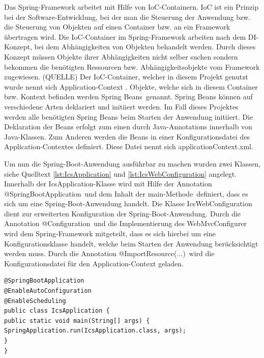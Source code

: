 Das Spring-Framework arbeitet mit Hilfe von \ac{IoC}-Containern. \ac{IoC} ist ein Prinzip bei der Software-Entwicklung, bei der man die Steuerung der Anwendung bzw. die Steuerung von Objekten auf einen Container bzw. an ein Framework übertragen wird. Die \ac{IoC}-Container im Spring-Framework arbeiten nach dem \ac{DI}-Konzept, bei dem Abhängigkeiten von Objekten behandelt werden. Durch dieses Konzept müssen Objekte ihrer Abhängigkeiten nicht selber suchen sondern bekommen die benötigten Ressourcen bzw. Abhängigkeitsobjekte vom Framework zugewiesen. (QUELLE) Der \ac{IoC}-Container, welcher in diesem Projekt genutzt wurde nennt sich \glqq Application-Context \grqq. Objekte, welche sich in diesem Container bzw. Kontext befinden werden \glqq Spring Beans\grqq \, genannt. Spring Beans können auf verschiedene Arten deklariert und initiiert werden. Im Fall dieses Projektes werden alle benötigten Spring Beans beim Starten der Anwendung initiiert. Die Deklaration der Beans erfolgt zum einen durch Java-Annotations innerhalb von Java-Klassen. Zum Anderen werden die Beans in einer Konfigurationsdatei des Application-Contextes definiert. Diese Datei nennt sich \glqq applicationContext.xml\grqq.

Um nun die Spring-Boot-Anwendung ausführbar zu machen wurden zwei Klassen, siehe Quelltext \ref{lst:IcsApplication} und \ref{lst:IcsWebConfiguration} angelegt. Innerhalb der IcsApplication-Klasse wird mit Hilfe der Annotation \glqq @SpringBootApplication\grqq \, und dem Inhalt der \glqq main-Methode\grqq \, definiert, dass es sich um eine Spring-Boot-Anwendung handelt. Die Klasse \glqq IcsWebConfiguration\grqq \, dient zur erweiterten Konfiguration der Spring-Boot-Anwendung. Durch die Annotation \glqq @Configuration\grqq \, und die Implementierung des \glqq WebMvcConfigurer\grqq \, wird dem Spring-Framework mitgeteilt, dass es sich hierbei um eine Konfigurationsklasse handelt, welche beim Starten der Anwendung berücksichtigt werden muss. Durch die Annotation \glqq @ImportResource(...)\grqq \, wird die Konfigurationsdatei für den Application-Context geladen.

\lstset{language=Java}
\begin{lstlisting}[caption={IcsApplication.java}, label={lst:IcsApplication}]
@SpringBootApplication
@EnableAutoConfiguration
@EnableScheduling
public class IcsApplication {
public static void main(String[] args) {
SpringApplication.run(IcsApplication.class, args);
}
}
\end{lstlisting}


